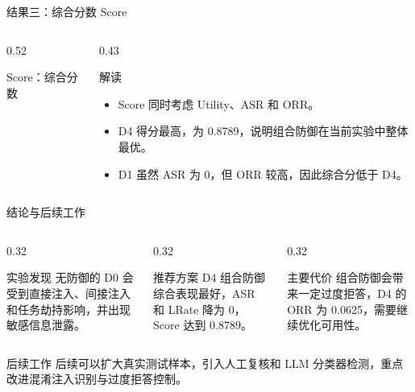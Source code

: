 \documentclass[aspectratio=169,11pt]{beamer}
\newcommand{\simplebar}[4]{
  \node[anchor=east] at (0,#4) {\scriptsize #1};
  \draw[fill=gray!15,draw=gray!30] (0.18,#4-0.11) rectangle (4.18,#4+0.11);
  \draw[fill=#3,draw=#3] (0.18,#4-0.11) rectangle ({0.18 + 4*#2},#4+0.11);
  \node[anchor=west] at (4.35,#4) {\scriptsize #2};
}
\begin{document}
\begin{frame}{结果三：综合分数 Score}
  \begin{columns}[T]
    \begin{column}{0.52\textwidth}
      \begin{block}{Score：综合分数}
        \centering
      \end{block}
    \end{column}
    \begin{column}{0.43\textwidth}
      \begin{block}{解读}
        \begin{itemize}
          \item Score 同时考虑 Utility、ASR 和 ORR。
          \item D4 得分最高，为 0.8789，说明组合防御在当前实验中整体最优。
          \item D1 虽然 ASR 为 0，但 ORR 较高，因此综合分低于 D4。
        \end{itemize}
      \end{block}
    \end{column}
  \end{columns}
\end{frame}

\begin{frame}{结论与后续工作}
  \begin{columns}[T]
    \begin{column}{0.32\textwidth}
      \begin{block}{实验发现}
        无防御的 D0 会受到直接注入、间接注入和任务劫持影响，并出现敏感信息泄露。
      \end{block}
    \end{column}
    \begin{column}{0.32\textwidth}
      \begin{block}{推荐方案}
        D4 组合防御综合表现最好，ASR 和 LRate 降为 0，Score 达到 0.8789。
      \end{block}
    \end{column}
    \begin{column}{0.32\textwidth}
      \begin{block}{主要代价}
        组合防御会带来一定过度拒答，D4 的 ORR 为 0.0625，需要继续优化可用性。
      \end{block}
    \end{column}
  \end{columns}
  \vspace{1em}
  \begin{block}{后续工作}
    后续可以扩大真实测试样本，引入人工复核和 LLM 分类器检测，重点改进混淆注入识别与过度拒答控制。
  \end{block}
\end{frame}
\end{document}
